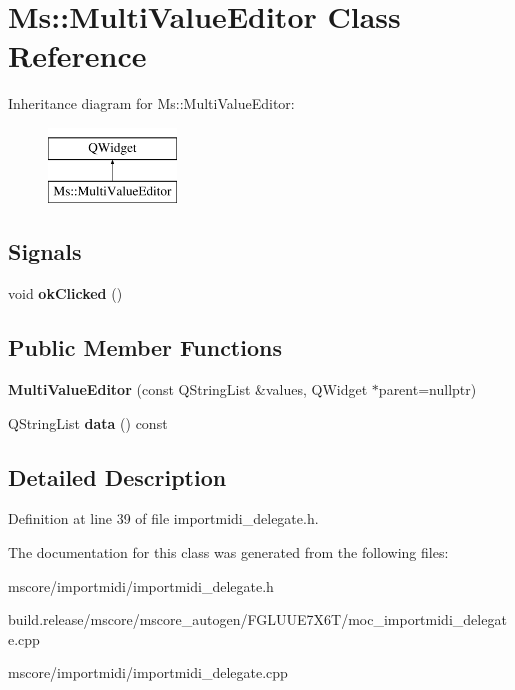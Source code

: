 \hypertarget{class_ms_1_1_multi_value_editor}{}\section{Ms\+:\+:Multi\+Value\+Editor Class Reference}
\label{class_ms_1_1_multi_value_editor}
Inheritance diagram for Ms\+:\+:Multi\+Value\+Editor\+:\begin{figure}[H]
\begin{center}
\leavevmode
\includegraphics[height=2.000000cm]{class_ms_1_1_multi_value_editor}
\end{center}
\end{figure}
\subsection*{Signals}
\begin{DoxyCompactItemize}
\item 
\mbox{\label{class_ms_1_1_multi_value_editor_a27a656d2a41b5c84646da108eb06399a}} 
void {\bfseries ok\+Clicked} ()
\end{DoxyCompactItemize}
\subsection*{Public Member Functions}
\begin{DoxyCompactItemize}
\item 
\mbox{\label{class_ms_1_1_multi_value_editor_abe1436921b8db28788a2318f7cdbcbdf}} 
{\bfseries Multi\+Value\+Editor} (const Q\+String\+List \&values, Q\+Widget $\ast$parent=nullptr)
\item 
\mbox{\label{class_ms_1_1_multi_value_editor_a587435de3919124d1b2eac6a3a87bf87}} 
Q\+String\+List {\bfseries data} () const
\end{DoxyCompactItemize}


\subsection{Detailed Description}


Definition at line 39 of file importmidi\+\_\+delegate.\+h.



The documentation for this class was generated from the following files\+:\begin{DoxyCompactItemize}
\item 
mscore/importmidi/importmidi\+\_\+delegate.\+h\item 
build.\+release/mscore/mscore\+\_\+autogen/\+F\+G\+L\+U\+U\+E7\+X6\+T/moc\+\_\+importmidi\+\_\+delegate.\+cpp\item 
mscore/importmidi/importmidi\+\_\+delegate.\+cpp\end{DoxyCompactItemize}
